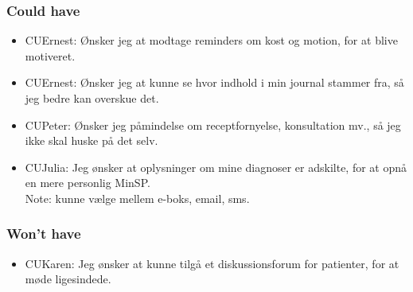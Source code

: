 \subsubsection*{Could have}
\begin{itemize}
\item CUErnest: Ønsker jeg at modtage reminders om kost og motion, for at blive motiveret.
\item CUErnest: Ønsker jeg at kunne se hvor indhold i min journal stammer fra, så jeg bedre kan overskue det.
\item CUPeter: Ønsker jeg påmindelse om receptfornyelse, konsultation mv., så jeg ikke skal huske på det selv.
\item CUJulia: Jeg ønsker at oplysninger om mine diagnoser er adskilte, for at opnå en mere personlig MinSP.\\
Note: kunne vælge mellem e-boks, email, sms.
\end{itemize}
\subsubsection*{Won't have}
\begin{itemize}
\item CUKaren: Jeg ønsker at kunne tilgå et diskussionsforum for patienter, for at møde ligesindede.\\
\end{itemize}